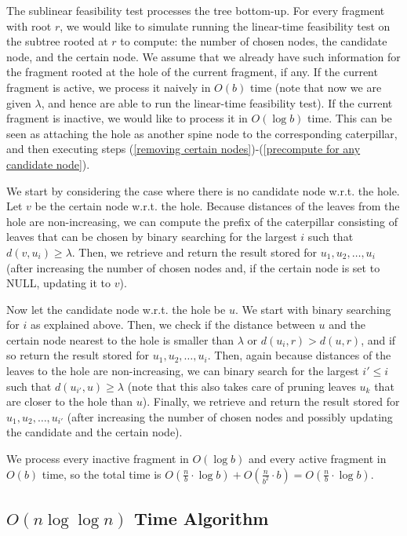 \documentclass[a4paper,UKenglish]{lipics-v2016}
\theoremstyle{plain}
\begin{document}
The sublinear feasibility test processes the tree bottom-up. For every fragment with root $r$, we would like to simulate running the
linear-time feasibility test on the subtree rooted at $r$ to compute: the number of chosen nodes, the candidate node, and the certain
node. We assume that we already have such information for the fragment rooted at the hole of the current fragment, if any.
If the current fragment is active, we process it naively in $O(b)$ time (note that now we are given $\lambda$, and hence are
able to run the linear-time feasibility test). If the current fragment is inactive, we would like to process it in $O(\log b)$ time.
This can be seen as attaching the hole as another spine node to the corresponding caterpillar, and then executing steps
(\ref{removing certain nodes})-(\ref{precompute for any candidate node}).

We start by considering the case where there is no candidate node w.r.t. the hole. Let $v$ be the certain node w.r.t. the hole.
Because distances of the leaves from the hole are non-increasing,  we can compute the prefix of the caterpillar consisting of
leaves that can be chosen by binary searching for the largest $i$ such that $d(v,u_{i})\geq \lambda$. Then, we retrieve and return the result
stored for $u_{1},u_{2},\ldots,u_{i}$ (after increasing the number of chosen nodes and, if the certain node is set to NULL, updating it to $v$).

Now let the candidate node w.r.t. the hole be $u$. We start with binary searching for $i$ as explained above. Then,
we check if the distance between $u$ and the certain node nearest to the hole is smaller than $\lambda$ or
$d(u_{i},r)>d(u,r)$, and if so return the result stored for $u_{1},u_{2},\ldots,u_{i}$. Then, again because distances of the leaves
to the hole are non-increasing, we can binary search for the largest $i'\leq i$ such that $d(u_{i'},u)\geq \lambda$
(note that this also takes care of pruning leaves $u_{k}$ that are closer to the hole than $u$).
Finally, we retrieve and return the result stored for $u_{1},u_{2},\ldots,u_{i'}$ (after increasing the number of chosen nodes
and possibly updating the candidate and the certain node).

We process every inactive fragment in $O(\log b)$ and every active fragment in $O(b)$ time, so the total time is
$O(\frac{n}{b} \cdot \log b) + O(\frac{n}{b^2} \cdot b) = O(\frac{n}{b}\cdot \log b)$.

\subsection{\texorpdfstring{\boldmath$O(n\log\log n)$}{O(nloglogn)} Time Algorithm} 
\end{document}
